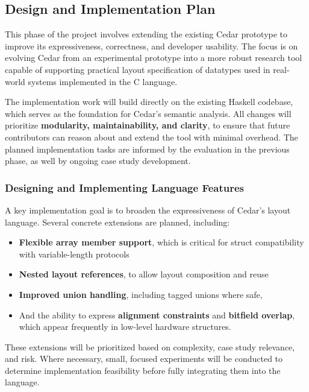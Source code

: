 \documentclass[12pt]{article}
\begin{document}
\subsection{Design and Implementation Plan}
This phase of the project involves extending the existing Cedar prototype to
improve its expressiveness, correctness, and developer usability. The focus is on
evolving Cedar from an experimental prototype into a more robust research tool
capable of supporting practical layout specification of datatypes used in real-world 
systems implemented in the C language.

The implementation work will build directly on the existing Haskell codebase,
which serves as the foundation for Cedar's semantic analysis. All changes will
prioritize \textbf{modularity, maintainability, and clarity}, to ensure that
future contributors can reason about and extend the tool with minimal
overhead. The planned implementation tasks are informed by the evaluation
in the previous phase, as well by ongoing case study development.

\subsubsection{Designing and Implementing Language Features}
A key implementation goal is to broaden the expressiveness of Cedar's layout
language. Several concrete extensions are planned, including:
\begin{itemize}
    \item \textbf{Flexible array member support}, which is critical for
    struct compatibility with variable-length protocols
    \item \textbf{Nested layout references}, to allow layout composition and
    reuse
    \item \textbf{Improved union handling}, including tagged unions where safe,
    \item And the ability to express \textbf{alignment constraints} and
    \textbf{bitfield overlap}, which appear frequently in low-level hardware
    structures.
\end{itemize}

These extensions will be prioritized based on complexity, case study relevance,
and risk. Where necessary, small, focused experiments will be conducted to
determine implementation feasibility before fully integrating them into
the language.
\end{document}
